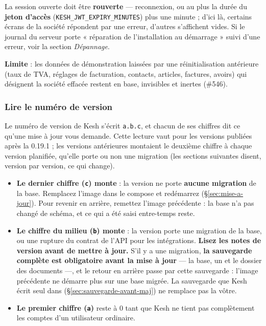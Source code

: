 \documentclass[a4paper,11pt,oneside]{article}
\begin{document}
La session ouverte doit être \textbf{rouverte} --- reconnexion, ou au plus la durée du \textbf{jeton d'accès} (\texttt{KESH\_JWT\_EXPIRY\_MINUTES}) plus une minute ; d'ici là, certains écrans de la société répondent par une erreur, d'autres s'affichent vides. Si le journal du serveur porte « réparation de l'installation au démarrage » suivi d'une erreur, voir la section \emph{Dépannage}.

\textbf{Limite} : les données de démonstration laissées par une réinitialisation antérieure (taux de TVA, réglages de facturation, contacts, articles, factures, avoirs) qui désignent la société effacée restent en base, invisibles et inertes (\#546).

\subsubsection{Lire le numéro de version}\label{sec:lire-numero-version}

Le numéro de version de Kesh s'écrit \texttt{a.b.c}, et chacun de ses chiffres dit ce qu'une mise à jour vous demande. Cette lecture vaut pour les versions publiées après la 0.19.1 ; les versions antérieures montaient le deuxième chiffre à chaque version planifiée, qu'elle porte ou non une migration (les sections suivantes disent, version par version, ce qui change).

\begin{itemize}
    \item \textbf{Le dernier chiffre (\texttt{c}) monte} : la version ne porte \textbf{aucune migration} de la base. Remplacez l'image dans le compose et redémarrez (\S\ref{sec:mise-a-jour}). Pour revenir en arrière, remettez l'image précédente : la base n'a pas changé de schéma, et ce qui a été saisi entre-temps reste.
    \item \textbf{Le chiffre du milieu (\texttt{b}) monte} : la version porte une migration de la base, ou une rupture du contrat de l'API pour les intégrations. \textbf{Lisez les notes de version avant de mettre à jour.} S'il y a une migration, \textbf{la sauvegarde complète est obligatoire avant la mise à jour} --- la base, un  et le dossier des documents ---, et le retour en arrière passe par cette sauvegarde : l'image précédente ne démarre plus sur une base migrée. La sauvegarde que Kesh écrit seul dans  (\S\ref{sec:sauvegarde-avant-maj}) ne remplace pas la vôtre.
    \item \textbf{Le premier chiffre (\texttt{a})} reste à 0 tant que Kesh ne tient pas complètement les comptes d'un utilisateur ordinaire.
\end{itemize}
\end{document}
